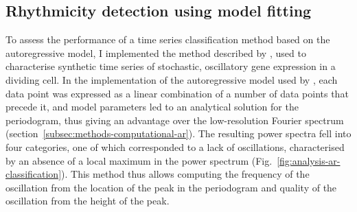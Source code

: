 \subsection{Rhythmicity detection using model fitting}
\label{subsec:analysis-classification-ar}


To assess the performance of a time series classification method based on the autoregressive model, I implemented the method described by \textcite{jiaFrequencyDomainAnalysis2020}, used to characterise synthetic time series of stochastic, oscillatory gene expression in a dividing cell.
In the implementation of the autoregressive model used by \textcite{jiaFrequencyDomainAnalysis2020}, each data point was expressed as a linear combination of a number of data points that precede it, and model parameters led to an analytical solution for the periodogram, thus giving an advantage over the low-resolution Fourier spectrum (section~\ref{subsec:methods-computational-ar}).
The resulting power spectra fell into four categories, one of which corresponded to a lack of oscillations, characterised by an absence of a local maximum in the power spectrum (Fig.\ \ref{fig:analysis-ar-classification}).
This method thus allows computing the frequency of the oscillation from the location of the peak in the periodogram and quality of the oscillation from the height of the peak.

